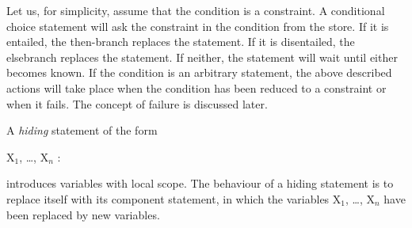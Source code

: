 Let us, for simplicity, assume that the condition is a constraint.  A
conditional choice statement will ask the constraint in the condition
from the store.  If it is entailed, the then-branch replaces the
statement.  If it is disentailed, the elsebranch replaces the
statement.  If neither, the statement will wait until either becomes
known.  If the condition is an arbitrary statement, the above described
actions will take place when the condition has been reduced to a
constraint or when it fails.  The concept of failure is discussed
later.

A {\em hiding} statement of the form
%
\begin{progex}
X$_1$, \dots, X$_n$ : 
\end{progex}%
%
introduces variables with local scope.  The behaviour of a hiding
statement is to replace itself with its component statement, in which
the variables {\prog X$_1$, \dots, X$_n$} have been replaced by new
variables.

